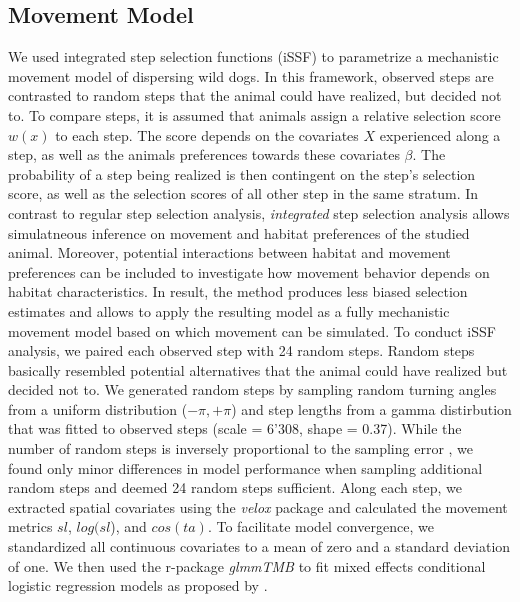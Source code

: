 \documentclass[abstract=on,10pt,a4paper,bibliography=totocnumbered]{article}
\begin{document}
\subsection{Movement Model}
We used integrated step selection functions (iSSF) to parametrize a mechanistic
movement model of dispersing wild dogs. In this framework, observed steps are
contrasted to random steps that the animal could have realized, but decided not
to. To compare steps, it is assumed that animals assign a relative selection
score \(w(x)\) to each step. The score depends on the covariates \(X\)
experienced along a step, as well as the animals preferences towards these
covariates \(\beta\). The probability of a step being realized is then
contingent on the step's selection score, as well as the selection scores of all
other step in the same stratum. In contrast to regular step selection analysis,
\textit{integrated} step selection analysis allows simulatneous inference on
movement and habitat preferences of the studied animal. Moreover, potential
interactions between habitat and movement preferences can be included to
investigate how movement behavior depends on habitat characteristics. In result,
the method produces less biased selection estimates and allows to apply the
resulting model as a fully mechanistic movement model based on which movement
can be simulated. To conduct iSSF analysis, we paired each observed step with 24
random steps. Random steps basically resembled potential alternatives that the
animal could have realized but decided not to. We generated random steps by
sampling random turning angles from a uniform distribution (\(-\pi, +\pi\)) and
step lengths from a gamma distirbution that was fitted to observed steps (scale
= 6'308, shape = 0.37). While the number of random steps is inversely
proportional to the sampling error \citep{Avgar.2016}, we found only minor
differences in model performance when sampling additional random steps and
deemed 24 random steps sufficient. Along each step, we extracted spatial
covariates using the \textit{velox} package and calculated the movement metrics
\(sl\), \(log(sl\)), and \(cos(ta)\). To facilitate model convergence, we
standardized all continuous covariates to a mean of zero and a standard
deviation of one. We then used the r-package \textit{glmmTMB} to fit mixed
effects conditional logistic regression models as proposed by \citep{Muff.2020}.
\end{document}
